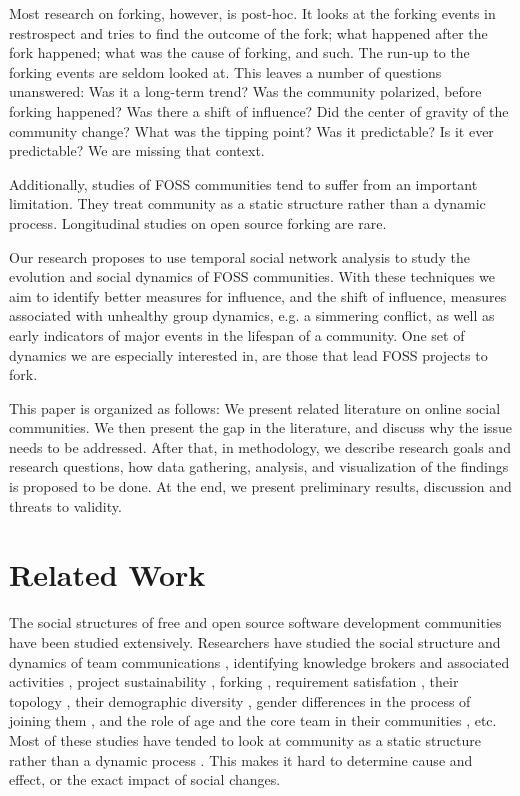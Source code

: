 \documentclass{acm_proc_article-sp}
\begin{document}
Most research on forking, however, is post-hoc. It looks at the forking events in restrospect and tries to find the outcome of the fork; what happened after the fork happened; what was the cause of forking, and such. The run-up to the forking events are seldom looked at. This leaves a number of questions unanswered: Was it a long-term trend? Was the community polarized, before forking happened? Was there a shift of influence? Did the center of gravity of the community change? What was the tipping point? Was it predictable? Is it ever predictable? We are missing that context. 

Additionally, studies of FOSS communities tend to suffer from an important limitation. They treat community as a static structure rather than a dynamic process. Longitudinal studies on open source forking are rare.

Our research proposes to use temporal social network analysis to study the evolution and social dynamics of FOSS communities. With these techniques we aim to identify better measures for influence, and the shift of influence, measures associated with unhealthy group dynamics, e.g. a simmering conflict, as well as early indicators of major events in the lifespan of a community. One set of dynamics we are especially interested in, are those that lead FOSS projects to fork. 

This paper is organized as follows: We present related literature on online social communities. We then present the gap in the literature, and discuss why the issue needs to be addressed. After that, in methodology, we describe research goals and research questions, how data gathering, analysis, and visualization of the findings is proposed to be done. At the end, we present preliminary results, discussion and threats to validity.

\section{Related Work}
\label{relatedwork}

The social structures of free and open source software development communities have been studied extensively. Researchers have studied the social structure and dynamics of team communications \cite{Bird}\cite{HowisonSocialDynamics}\cite{HowisonFlossMole}\cite{Guzzi}\cite{Nakakoji}, identifying knowledge brokers and associated activities \cite{Sowe}, project sustainability \cite{NymanForkingSustainability}\cite{Nakakoji}, forking \cite{NymanCodeForking}, requirement satisfation \cite{Ernst}, their topology \cite{Bird}, their demographic diversity \cite{Kunegis}, gender differences in the process of joining them \cite{Kuechler}, and the role of age and the core team in their communities \cite{Torres}\cite{DavidsonVLHCC2014}, etc. Most of these studies have tended to look at community as a static structure rather than a dynamic process \cite{CrowstonFLOSSWhatWeKnow}. This makes it hard to determine cause and effect, or the exact impact of social changes.
\end{document}
